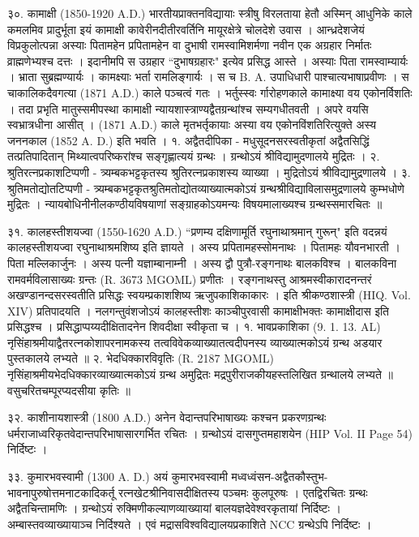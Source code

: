 ३०. कामाक्षी (1850-1920 A.D.)
भारतीयप्राक्तनविद्यायाः स्त्रीषु विरलताया हेतौ अस्मिन् आधुनिके काले कमलमिव प्रादुर्भूता इयं कामाक्षी कावेरीनदीतीरवर्तिनि मायूरक्षेत्रे चोलदेशे उवास । आन्ध्रदेशजेयं विप्रकुलोत्पन्ना अस्याः पितामहेन प्रपितामहेन वा दुभाषी रामस्वामिशर्मणा नवीन एक अग्रहार निर्मातः व्राह्मणेभ्यश्च दत्तः । इदानीमपि स उग्रहार ``दुभाषग्रहारः" इत्येव प्रसिद्ध आस्ते । अस्याः पिता रामस्वाम्यार्यः । भ्राता सुब्रह्मण्यार्यः ।
कामक्ष्याः भर्ता रामलिङ्गार्यः । स च B. A. उपाधिधारी पाश्चात्यभाषाप्रवीणः । स चाकालिकदैवगत्या (1871 A.D.) काले पञ्चत्वं गतः । भर्तुस्स्वः र्गारोहणकाले कामाक्ष्या वय एकोनर्विशतिः । तदा प्रभृति मातुस्समीपस्था कामाक्षी न्यायशास्त्राण्यद्वैतग्रन्थांश्च सम्यगधीतवती । अपरे वयसि स्वभ्रात्रधीना आसीत् । (1871 A.D.) काले मृतभर्तृकायाः अस्या वय एकोनविंशतिरित्युक्ते अस्य जननकाल (1852 A. D.) इति भवति ।
१. अद्वैतदीपिका - मधुसूदनसरस्वतीकृतां अद्वैतसिद्धिं तत्प्रतिपादितान् मिथ्यात्वपरिष्करांश्च सङ्गृह्णात्ययं ग्रन्थः । ग्रन्थोऽयं श्रीविद्यामुदणालये मुद्रितः ।
२. श्रुतिरत्नप्रकाशटिप्पणी - त्र्यम्बकभट्टकृतस्य श्रुतिरत्नप्रकाशस्य व्याख्या । मुद्रितोऽयं श्रीविद्यामुद्रणालये ।
३. श्रुतिमतोद्योतटिप्पणी - त्र्यम्बकभट्टकृतश्रुतिमतोद्योतव्याख्यात्मकोऽयं ग्रन्थश्रीविद्याविलासमुद्रणालये कुम्भधोणे मुद्रितः ।
न्यायबोधिनीनीलकण्ठीयविषयाणां सङ्ग्राहकोऽयमन्यः विषयमालाख्यश्च ग्रन्थस्समारचितः ॥

३१. कालहस्तीशयज्वा (1550-1620 A.D.)
``प्रणम्य दक्षिणामूर्ति रघुनाथाश्रमान् गुरून्" इति वदन्नयं कालहस्तीशयज्वा रघुनाथाश्रमशिष्य इति ज्ञायते । अस्य प्रपितामहस्सोमनाथः । पितामहः यौवनभारती । पिता मल्लिकार्जुनः । अस्य पत्नी यज्ञाम्बानाम्नी । अस्य द्वौ पुत्रौ-रङ्गनाथः बालकविश्च । बालकविना रामवर्मविलासाख्यः ग्रन्तः (R. 3673 MGOML) प्रणीतः । रङ्गनाथस्तु आश्रमस्वीकारादनन्तरं अखण्डानन्दसरस्वतीति प्रसिद्धः स्वयम्प्रकाशशिष्य ऋजुपकाशिकाकारः । इति श्रीकण्ठशास्त्री (HIQ. Vol. XIV) प्रतिपादयति । नलगन्तुवंशजोऽयं कालहस्तीशः काञ्चीपुरवासी कामाक्षीभक्तः कामाक्षीदास इति प्रसिद्धश्च । प्रसिद्धाप्पय्यदीक्षितादनेन शिवदीक्षा स्वीकृता च ।
१. भावप्रकाशिका (9. 1. 13. AL)
नृसिंहाश्रमीयाद्वैतरत्नकोशापरनामकस्य तत्वविवेकव्याख्यातत्वदीपनस्य व्याख्यात्मकोऽयं ग्रन्थ अडयार पुस्तकालये लभ्यते ॥
२. भेदधिक्कारविवृतिः (R. 2187 MGOML)
नृसिंहाश्रमीयभेदधिक्कारव्याख्यात्मकोऽयं ग्रन्थ अमुद्रितः मद्रपुरीराजकीयहस्तलिखित ग्रन्थालये लभ्यते ॥ वसुचरितचम्पूरप्यदसीया कृतिः ॥

३२. काशीनायशास्त्री (1800 A.D.)
अनेन वेदान्तपरिभाषाख्यः कश्चन प्रकरणग्रन्थः धर्मराजाध्वरिकृतवेदान्तपरिभाषासारगर्भित रचितः । ग्रन्थोऽयं दासगुप्तमहाशयेन (HIP Vol. II Page 54) निर्दिष्टः ।

३३. कुमारभवस्वामी (1300 A. D.)
अयं कुमारभवस्वामी मध्वध्वंसन-अद्वैतकौस्तुभ-भावनापुरुषोत्तमनाटकादिकर्तू रत्नखेटश्रीनिवासदीक्षितस्य पञ्चमः कुलपूरुषः । एतद्विरचितः ग्रन्थः अद्वैतचिन्तामणिः । ग्रन्थोऽयं रुक्मिणीकल्याणव्याख्यायां बालयज्ञदेवेश्वरकृतायां निर्दिष्टः । अम्बास्तवव्याख्यायाञ्च निर्दिश्यते । एवं मद्रासविश्वविद्यालयप्रकाशिते NCC ग्रन्थेऽपि निर्दिष्टः ।

